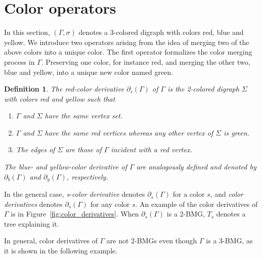 \documentclass[final,3p,times]{elsarticle}
\newtheorem{definition}{Definition}[section]
\begin{document}
\section{Color operators}
\label{sec:operators}
In this section, $(\Gamma,\sigma)$ denotes a 3-colored digraph with colors red, blue and yellow. 
We introduce two operators arising from the idea of merging two of the above colors into a unique color. The first operator formalizes the color merging process in $\Gamma$. Preserving one color, for instance red, and merging the other two, blue and yellow, into a unique new color named green.

\begin{definition}
\label{def:color-derivative}
The \emph{red-color derivative} $\partial_r(\Gamma)$ of $\Gamma$ is the 2-colored digraph $\Sigma$ with colors red and yellow such that
\begin{enumerate}
    \item $\Gamma$ and $\Sigma$ have the same vertex set. 
    \item $\Gamma$ and $\Sigma$ have the same red vertices whereas any other vertex of $\Sigma$ is green. 
    \item The edges of $\Sigma$ are those of $\Gamma$ incident with a red vertex. 
\end{enumerate}
The blue- and yellow-color derivative of $\Gamma$ are analogously defined and denoted by $\partial_b(\Gamma)$ and $\partial_y(\Gamma)$, respectively. 
\end{definition} 

In the general case, \emph{s-color derivative} denotes $\partial_s(\Gamma)$ for a color $s$, and \emph{color derivatives} denotes $\partial_s(\Gamma)$ for any color $s$. An example of the color derivatives of $\Gamma$ is in Figure~\ref{fig:color_derivatives}. When $\partial_s(\Gamma)$ is a 2-BMG, $T_s$ denotes a tree explaining it.

In general, color derivatives of $\Gamma$ are not 2-BMGs even though $\Gamma$ is a 3-BMG, as it is shown in the following example.
\end{document}
